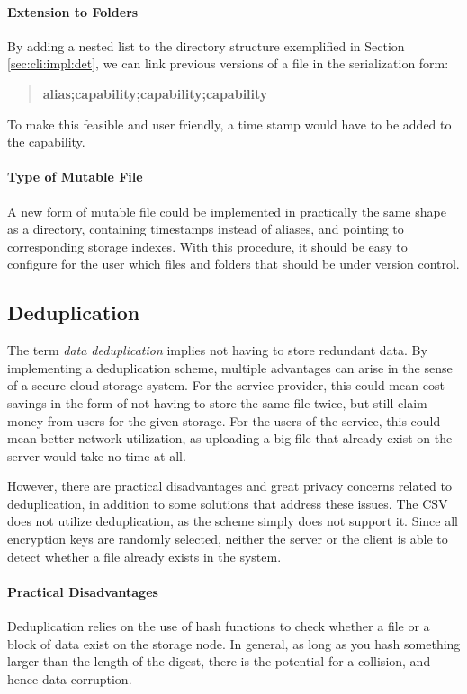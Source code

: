 \documentclass[pdftex,english,10pt,b5paper,twoside]{book}
\begin{document}
\paragraph{Extension to Folders} By adding a nested list to the directory
structure exemplified in Section \ref{sec:cli:impl:det}, we can link previous
versions of a file in the serialization form:

\begin{quote}
    \centering
    \textbf{alias;capability;capability;capability}
\end{quote}

To make this feasible and user friendly, a time stamp would have to be added to
the capability.

\paragraph{Type of Mutable File} A new form of mutable file could be
implemented in practically the same shape as a directory, containing timestamps
instead of aliases, and pointing to corresponding storage indexes. With this
procedure, it should be easy to configure for the user which files and folders
that should be under version control.

\subsection{Deduplication}

The term \emph{data deduplication} implies not having to store redundant data.
By implementing a deduplication scheme, multiple advantages can arise in the
sense of a secure cloud storage system. For the service provider, this could
mean cost savings in the form of not having to store the same file twice, but
still claim money from users for the given storage. For the users of the
service, this could mean better network utilization, as uploading a big file
that already exist on the server would take no time at all.

However, there are practical disadvantages and great privacy concerns related
to deduplication, in addition to some solutions that address these issues.
The \ac{CSV} does not utilize deduplication, as the scheme simply does not
support it. Since all encryption keys are randomly selected, neither the server
or the client is able to detect whether a file already exists in the system.

\paragraph{Practical Disadvantages} Deduplication relies on the use of hash
functions to check whether a file or a block of data exist on the storage node.
In general, as long as you hash something larger than the length of the digest,
there is the potential for a collision, and hence data corruption.
\end{document}
